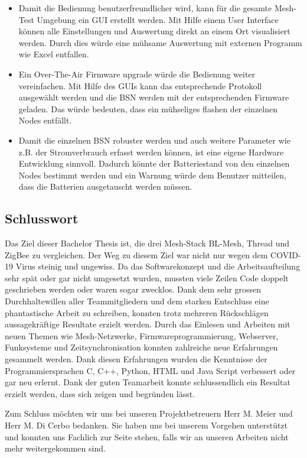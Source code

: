 \begin{itemize}
	\item Damit die Bedienung benutzerfreundlicher wird, kann für die gesamte Mesh-Test Umgebung ein GUI erstellt werden. Mit Hilfe einem User Interface können alle Einstellungen und Auswertung direkt an einem Ort visualisiert werden. Durch dies würde eine mühsame Auswertung mit externen Programm wie Excel entfallen.
	\item Ein Over-The-Air Firmware upgrade würde die Bedienung weiter vereinfachen. Mit Hilfe des GUIs kann das entsprechende Protokoll ausgewählt werden und die BSN werden mit der entsprechenden Firmware geladen. Das würde bedeuten, dass ein mühseliges flashen der einzelnen Nodes entfällt.
	\item Damit die einzelnen BSN robuster werden und auch weitere Parameter wie z.B. der Stromverbrauch erfasst werden können, ist eine eigene Hardware Entwicklung sinnvoll. Dadurch könnte der Batteriestand von den einzelnen Nodes bestimmt werden und ein Warnung würde dem Benutzer mitteilen, dass die Batterien ausgetauscht werden müssen.
\end{itemize}

\subsection{Schlusswort}\label{subsec:Schlusswort}
Das Ziel dieser Bachelor Thesis ist, die drei Mesh-Stack BL-Mesh, Thread und ZigBee zu vergleichen. Der Weg zu diesem Ziel war nicht nur wegen dem COVID-19 Virus steinig und ungewiss. Da das Softwarekonzept und die Arbeitsaufteilung sehr spät oder gar nicht umgesetzt wurden, mussten viele Zeilen Code doppelt geschrieben werden oder waren sogar zwecklos. Dank dem sehr grossen Durchhaltewillen aller Teammitgliedern und dem starken Entschluss eine phantastische Arbeit zu schreiben, konnten trotz mehreren Rückschlägen aussagekräftige Resultate erzielt werden. Durch das Einlesen und Arbeiten mit neuen Themen wie Mesh-Netzwerke, Firmwareprogrammierung, Webserver, Funksysteme und Zeitsynchronisation konnten zahlreiche neue Erfahrungen gesammelt werden. Dank diesen Erfahrungen wurden die Kenntnisse der Programmiersprachen C, C++, Python, HTML und Java Script verbessert oder gar neu erlernt. Dank der guten Teamarbeit konnte schlussendlich ein Resultat erzielt werden, dass sich zeigen und begründen lässt. 

Zum Schluss möchten wir uns bei unseren Projektbetreuern Herr M. Meier und Herr M. Di Cerbo bedanken. Sie haben uns bei unserem Vorgehen unterstützt und konnten uns Fachlich zur Seite stehen, falls wir an unseren Arbeiten nicht mehr weitergekommen sind.